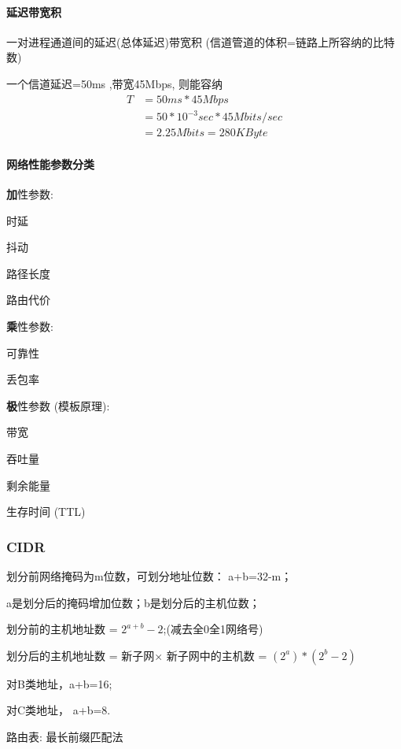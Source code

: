 \documentclass[UTF8,cs4size]{ctexart}
\begin{document}
\paragraph{延迟带宽积}

一对进程通道间的延迟(总体延迟)带宽积 (信道管道的体积=链路上所容纳的比特数)

一个信道延迟=50ms ,带宽45Mbps, 则能容纳
\begin{align*}
T & = 50ms* 45Mbps \\
& = 50*10^{-3} sec*45Mbits/sec \\
& = 2.25Mbits=280KByte 
\end{align*}

\paragraph{网络性能参数分类}

\textbf{加}性参数:
\begin{compactitem}
  \item 时延
  \item 抖动
  \item 路径长度
  \item 路由代价
\end{compactitem}

\textbf{乘}性参数:
\begin{compactitem}
  \item 可靠性
  \item 丢包率
\end{compactitem}

\textbf{极}性参数 (模板原理):
\begin{compactitem}
  \item 带宽
  \item 吞吐量
  \item 剩余能量
  \item 生存时间 (TTL)
\end{compactitem}

\subsubsection{CIDR}
\begin{compactitem}
  \item 划分前网络掩码为m位数，可划分地址位数： a+b=32-m；
  \item a是划分后的掩码增加位数；b是划分后的主机位数；
  \item 划分前的主机地址数 = $2^{a+b}-2$;(减去全0全1网络号)
  \item 划分后的主机地址数 = 新子网× 新子网中的主机数 = $(2^a)*(2^b-2)$
  \item 对B类地址，a+b=16;
  \item 对C类地址， a+b=8.
  \item 路由表: 最长前缀匹配法
\end{compactitem}
\end{document}
